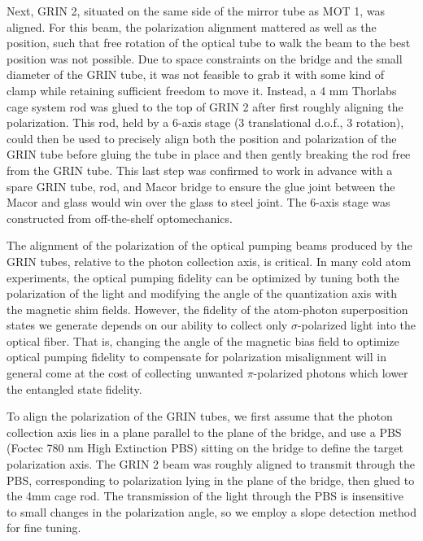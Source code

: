 Next, GRIN 2, situated on the same side of the mirror tube as MOT 1, was aligned. For this beam, the polarization alignment mattered as well as the position, such that free rotation of the optical tube to walk the beam to the best position was not possible. Due to space constraints on the bridge and the small diameter of the GRIN tube, it was not feasible to grab it with some kind of clamp while retaining sufficient freedom to move it. Instead, a 4 mm Thorlabs cage system rod was glued to the top of GRIN 2 after first roughly aligning the polarization. This rod, held by a 6-axis stage (3 translational d.o.f., 3 rotation), could then be used to precisely align both the position and polarization of the GRIN tube before gluing the tube in place and then gently breaking the rod free from the GRIN tube. This last step was confirmed to work in advance with a spare GRIN tube, rod, and Macor bridge to ensure the glue joint between the Macor and glass would win over the glass to steel joint. The 6-axis stage was constructed from off-the-shelf optomechanics.

The alignment of the polarization of the optical pumping beams produced by the GRIN tubes, relative to the photon collection axis, is critical. In many cold atom experiments, the optical pumping fidelity can be optimized by tuning both the polarization of the light and modifying the angle of the quantization axis with the magnetic shim fields. However, the fidelity of the atom-photon superposition states we generate depends on our ability to collect only $\sigma$-polarized light into the optical fiber. That is, changing the angle of the magnetic bias field to optimize optical pumping fidelity to compensate for polarization misalignment will in general come at the cost of collecting unwanted $\pi$-polarized photons which lower the entangled state fidelity. 

To align the polarization of the GRIN tubes, we first assume that the photon collection axis lies in a plane parallel to the plane of the bridge, and use a PBS (Foctec 780 nm High Extinction PBS) sitting on the bridge to define the target polarization axis. The GRIN 2 beam was roughly aligned to transmit through the PBS, corresponding to polarization lying in the plane of the bridge, then glued to the 4mm cage rod. The transmission of the light through the PBS is insensitive to small changes in the polarization angle, so we employ a slope detection method for fine tuning. 

